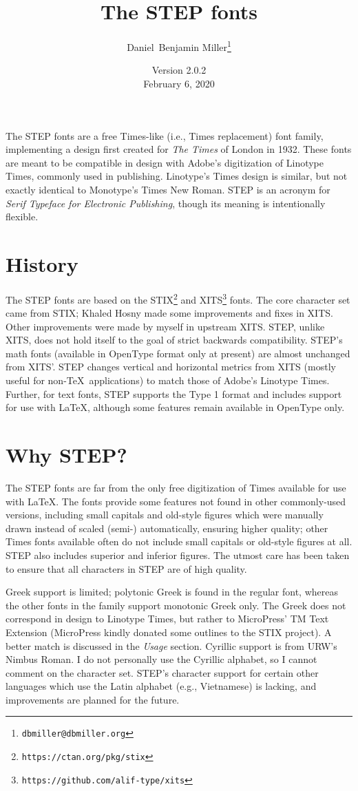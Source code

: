 \documentclass[12pt]{article}
\title{The STEP fonts}
\date{Version 2.0.2\\February 6, 2020}
\author{Daniel~Benjamin Miller\thanks{\texttt{dbmiller@dbmiller.org}}}
\begin{document}
\maketitle
The STEP fonts are a free Times-like (i.e., Times replacement) font family, implementing a design first created for \textit{The Times} of London in 1932. These fonts are meant to be compatible in design with Adobe's digitization of Linotype Times, commonly used in publishing. Linotype's Times design is similar, but not exactly identical to Monotype's Times New Roman. STEP is an acronym for \textit{Serif Typeface for Electronic Publishing}, though its meaning is intentionally flexible.
\section{History}
The STEP fonts are based on the STIX\footnote{\texttt{https://ctan.org/pkg/stix}} and XITS\footnote{\texttt{https://github.com/alif-type/xits}} fonts. The core character set came from STIX; Khaled Hosny made some improvements and fixes in XITS. Other improvements were made by myself in upstream XITS. STEP, unlike XITS, does not hold itself to the goal of strict backwards compatibility. STEP's math fonts (available in OpenType format only at present) are almost unchanged from XITS'. STEP changes vertical and horizontal metrics from XITS (mostly useful for non-\TeX\ applications) to match those of Adobe's Linotype Times. Further, for text fonts, STEP supports the Type 1 format and includes support for use with \LaTeX, although some features remain available in OpenType only.
\section{Why STEP?}
The STEP fonts are far from the only free digitization of Times available for use with \LaTeX. The fonts provide some features not found in other commonly-used versions, including small capitals and old-style figures which were manually drawn instead of scaled (semi-) automatically, ensuring higher quality; other Times fonts available often do not include small capitals or old-style figures at all. STEP also includes superior and inferior figures. The utmost care has been taken to ensure that all characters in STEP are of high quality.

Greek support is limited; polytonic Greek is found in the regular font, whereas the other fonts in the family support monotonic Greek only. The Greek does not correspond in design to Linotype Times, but rather to MicroPress' TM Text Extension (MicroPress kindly donated some outlines to the STIX project). A better match is discussed in the \textit{Usage} section. Cyrillic support is from URW's Nimbus Roman. I do not personally use the Cyrillic alphabet, so I cannot comment on the character set. STEP's character support for certain other languages which use the Latin alphabet (e.g., Vietnamese) is lacking, and improvements are planned for the future.
\end{document}
